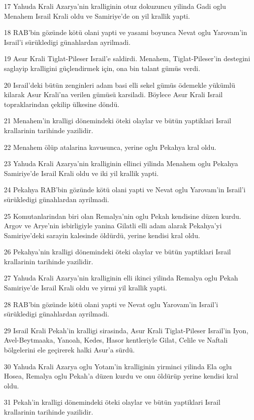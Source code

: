 \par 17 Yahuda Krali Azarya'nin kralliginin otuz dokuzuncu yilinda Gadi oglu Menahem Israil Krali oldu ve Samiriye'de on yil krallik yapti.
\par 18 RAB'bin gözünde kötü olani yapti ve yasami boyunca Nevat oglu Yarovam'in Israil'i sürükledigi günahlardan ayrilmadi.
\par 19 Asur Krali Tiglat-Pileser Israil'e saldirdi. Menahem, Tiglat-Pileser'in destegini saglayip kralligini güçlendirmek için, ona bin talant gümüs verdi.
\par 20 Israil'deki bütün zenginleri adam basi elli sekel gümüs ödemekle yükümlü kilarak Asur Krali'na verilen gümüsü karsiladi. Böylece Asur Krali Israil topraklarindan çekilip ülkesine döndü.
\par 21 Menahem'in kralligi dönemindeki öteki olaylar ve bütün yaptiklari Israil krallarinin tarihinde yazilidir.
\par 22 Menahem ölüp atalarina kavusunca, yerine oglu Pekahya kral oldu.
\par 23 Yahuda Krali Azarya'nin kralliginin ellinci yilinda Menahem oglu Pekahya Samiriye'de Israil Krali oldu ve iki yil krallik yapti.
\par 24 Pekahya RAB'bin gözünde kötü olani yapti ve Nevat oglu Yarovam'in Israil'i sürükledigi günahlardan ayrilmadi.
\par 25 Komutanlarindan biri olan Remalya'nin oglu Pekah kendisine düzen kurdu. Argov ve Arye'nin isbirligiyle yanina Gilatli elli adam alarak Pekahya'yi Samiriye'deki sarayin kalesinde öldürdü, yerine kendisi kral oldu.
\par 26 Pekahya'nin kralligi dönemindeki öteki olaylar ve bütün yaptiklari Israil krallarinin tarihinde yazilidir.
\par 27 Yahuda Krali Azarya'nin kralliginin elli ikinci yilinda Remalya oglu Pekah Samiriye'de Israil Krali oldu ve yirmi yil krallik yapti.
\par 28 RAB'bin gözünde kötü olani yapti ve Nevat oglu Yarovam'in Israil'i sürükledigi günahlardan ayrilmadi.
\par 29 Israil Krali Pekah'in kralligi sirasinda, Asur Krali Tiglat-Pileser Israil'in Iyon, Avel-Beytmaaka, Yanoah, Kedes, Hasor kentleriyle Gilat, Celile ve Naftali bölgelerini ele geçirerek halki Asur'a sürdü.
\par 30 Yahuda Krali Azarya oglu Yotam'in kralliginin yirminci yilinda Ela oglu Hosea, Remalya oglu Pekah'a düzen kurdu ve onu öldürüp yerine kendisi kral oldu.
\par 31 Pekah'in kralligi dönemindeki öteki olaylar ve bütün yaptiklari Israil krallarinin tarihinde yazilidir.

